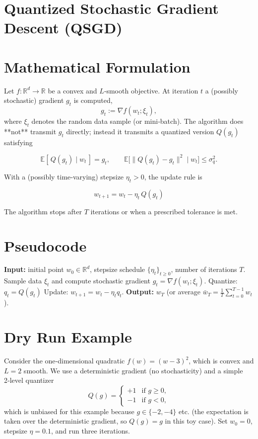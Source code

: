 \documentclass{article}
\newcommand{\E}{\mathbb{E}}
\newcommand{\R}{\mathbb{R}}
\begin{document}
\section*{Quantized Stochastic Gradient Descent (QSGD)}

\section*{Mathematical Formulation}
Let $f:\R^{d}\rightarrow\R$ be a convex and $L$‑smooth objective.  
At iteration $t$ a (possibly stochastic) gradient $g_t$ is computed,
\[
g_t:=\nabla f(w_t;\xi_t),
\]
where $\xi_t$ denotes the random data sample (or mini‑batch).  
The algorithm does **not** transmit $g_t$ directly; instead it transmits a
quantized version $Q(g_t)$ satisfying  

\[
\E[\,Q(g_t)\mid w_t\,]=g_t ,\qquad 
\E\!\big[\|Q(g_t)-g_t\|^{2}\mid w_t\big]\le \sigma_{q}^{2}.
\]

With a (possibly time‑varying) stepsize $\eta_t>0$, the update rule is  

\[
\boxed{ \; w_{t+1}=w_t-\eta_t\,Q(g_t)\; } \tag{1}
\]

The algorithm stops after $T$ iterations or when a prescribed tolerance is met.

\section*{Pseudocode}
\begin{algorithm}[H]
\caption{Quantized Stochastic Gradient Descent}
\begin{algorithmic}[1]
\State \textbf{Input:} initial point $w_0\in\R^{d}$, stepsize schedule $\{\eta_t\}_{t\ge0}$, number of iterations $T$.
    \State Sample data $\xi_t$ and compute stochastic gradient $g_t=\nabla f(w_t;\xi_t)$.
    \State Quantize: $q_t = Q(g_t)$  \Comment{unbiased: $\E[q_t|w_t]=g_t$}
    \State Update: $w_{t+1}= w_t - \eta_t q_t$.
\EndFor
\State \textbf{Output:} $w_T$ (or average $\bar w_T=\frac1T\sum_{t=0}^{T-1}w_t$).
\end{algorithmic}
\end{algorithm}

\section*{Dry Run Example}
Consider the one‑dimensional quadratic $f(w)=(w-3)^2$, which is convex and $L=2$ smooth.
We use a deterministic gradient (no stochasticity) and a simple 2‑level quantizer
\[
Q(g)=\begin{cases}
+1 &\text{if } g\ge 0,\\
-1 &\text{if } g<0,
\end{cases}
\]
which is unbiased for this example because $g\in\{-2, -4\}$ etc. (the expectation is taken over the deterministic gradient, so $Q(g)=g$ in this toy case).  
Set $w_0=0$, stepsize $\eta=0.1$, and run three iterations.
\end{document}
